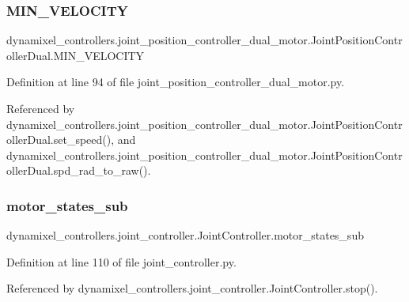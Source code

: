 \subsubsection{\texorpdfstring{M\+I\+N\+\_\+\+V\+E\+L\+O\+C\+I\+TY}{MIN\_VELOCITY}}
{\footnotesize\ttfamily dynamixel\+\_\+controllers.\+joint\+\_\+position\+\_\+controller\+\_\+dual\+\_\+motor.\+Joint\+Position\+Controller\+Dual.\+M\+I\+N\+\_\+\+V\+E\+L\+O\+C\+I\+TY}



Definition at line 94 of file joint\+\_\+position\+\_\+controller\+\_\+dual\+\_\+motor.\+py.



Referenced by dynamixel\+\_\+controllers.\+joint\+\_\+position\+\_\+controller\+\_\+dual\+\_\+motor.\+Joint\+Position\+Controller\+Dual.\+set\+\_\+speed(), and dynamixel\+\_\+controllers.\+joint\+\_\+position\+\_\+controller\+\_\+dual\+\_\+motor.\+Joint\+Position\+Controller\+Dual.\+spd\+\_\+rad\+\_\+to\+\_\+raw().

\mbox{\label{classdynamixel__controllers_1_1joint__controller_1_1_joint_controller_affc8be5e697a2ae71d284d8e0e59a4bd}} 
\subsubsection{\texorpdfstring{motor\+\_\+states\+\_\+sub}{motor\_states\_sub}}
{\footnotesize\ttfamily dynamixel\+\_\+controllers.\+joint\+\_\+controller.\+Joint\+Controller.\+motor\+\_\+states\+\_\+sub\hspace{0.3cm}{\ttfamily [inherited]}}



Definition at line 110 of file joint\+\_\+controller.\+py.



Referenced by dynamixel\+\_\+controllers.\+joint\+\_\+controller.\+Joint\+Controller.\+stop().

